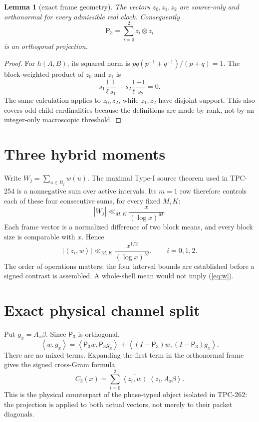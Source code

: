 \documentclass[11pt]{article}
\newtheorem{lemma}{Lemma}
\newcommand{\ip}[2]{\left\langle #1,#2\right\rangle}
\newcommand{\PP}{\mathsf P_3}
\begin{document}
\begin{lemma}[exact frame geometry]
The vectors \(z_0,z_1,z_2\) are source-only and orthonormal for every
admissible real clock.  Consequently
\[
 \PP=\sum_{i=0}^2 z_i\otimes z_i
\]
is an orthogonal projection.
\end{lemma}
\begin{proof}
For \(h(A,B)\), its squared norm is
\(pq(p^{-1}+q^{-1})/(p+q)=1\).  The block-weighted product of \(z_0\) and
\(z_1\) is
\[
 s_1\frac1\ell\frac1{s_1}+s_2\frac1\ell\frac{-1}{s_2}=0.
\]
The same calculation applies to \(z_0,z_2\), while \(z_1,z_2\) have disjoint
support.  This also covers odd child cardinalities because the definitions
are made by rank, not by an integer-only macroscopic threshold.
\end{proof}

\section{Three hybrid moments}
Write \(W_j=\sum_{u\in B_j}w(u)\).  The maximal Type-I source theorem used in
TPC-254 is a nonnegative sum over active intervals.  Its \(m=1\) row therefore
controls each of these four consecutive sums, for every fixed \(M,K\):
\[
 |W_j|\ll_{M,K}\frac{x}{(\log x)^M}.
\]
Each frame vector is a normalized difference of two block means, and every
block size is comparable with \(x\).  Hence
\begin{equation}
 |\ip{z_i}{w}|\ll_{M,K}\frac{x^{1/2}}{(\log x)^M},
 \qquad i=0,1,2.                                      \label{eq:w}
\end{equation}
The order of operations matters: the four interval bounds are established
before a signed contrast is assembled.  A whole-shell mean would not imply
(\ref{eq:w}).

\section{Exact physical channel split}
Put \(g_x=A_x\beta\).  Since \(\PP\) is orthogonal,
\begin{equation}
 \ip{w}{g_x}=\ip{\PP w}{\PP g_x}+
 \ip{(I-\PP)w}{(I-\PP)g_x}.                            \label{eq:split}
\end{equation}
There are no mixed terms.  Expanding the first term in the orthonormal frame
gives the signed cross-Gram formula
\begin{equation}
 C_3(x)=\sum_{i=0}^2
 \overline{\ip{z_i}{w}}\,\ip{z_i}{A_x\beta}.             \label{eq:channel}
\end{equation}
This is the physical counterpart of the phase-typed object isolated in
TPC-262: the projection is applied to both actual vectors, not merely to their
packet diagonals.
\end{document}
